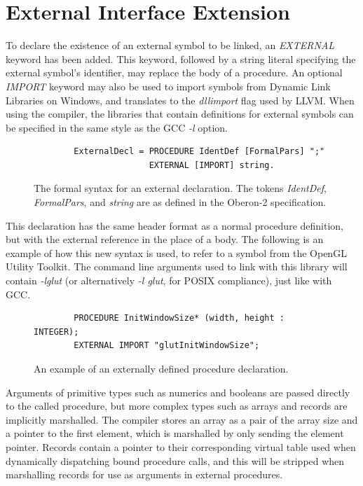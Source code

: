 \documentclass[a4paper,11pt]{article}
\begin{document}
    \section{External Interface Extension}
    To declare the existence of an external symbol to be linked, an \emph{EXTERNAL} keyword has been added. This keyword, followed by a string literal specifying the external symbol's identifier, may replace the body of a procedure. An optional \emph{IMPORT} keyword may also be used to import symbols from Dynamic Link Libraries on Windows, and translates to the \emph{dllimport} flag used by LLVM. When using the compiler, the libraries that contain definitions for external symbols can be specified in the same style as the GCC \emph{-l} option.

    \begin{figure}[!htbp]
    \begin{lstlisting}
        ExternalDecl = PROCEDURE IdentDef [FormalPars] ";"
                       EXTERNAL [IMPORT] string.
    \end{lstlisting}
    \caption{The formal syntax for an external declaration. The tokens \emph{IdentDef}, \emph{FormalPars}, and \emph{string} are as defined in the Oberon-2 specification\cite{oberspec}.}
    \end{figure}

    \noindent
    This declaration has the same header format as a normal procedure definition, but with the external reference in the place of a body. The following is an example of how this new syntax is used, to refer to a symbol from the OpenGL Utility Toolkit\cite{glut}. The command line arguments used to link with this library will contain \emph{-lglut} (or alternatively \emph{-l glut}, for POSIX compliance), just like with GCC.

    \begin{figure}[!htbp]
    \begin{lstlisting}
        PROCEDURE InitWindowSize* (width, height : INTEGER);
        EXTERNAL IMPORT "glutInitWindowSize";
    \end{lstlisting}
    \caption{An example of an externally defined procedure declaration.}
    \end{figure}

    \noindent
    Arguments of primitive types such as numerics and booleans are passed directly to the called procedure, but more complex types such as arrays and records are implicitly marshalled. The compiler stores an array as a pair of the array size and a pointer to the first element, which is marshalled by only sending the element pointer. Records contain a pointer to their corresponding virtual table used when dynamically dispatching bound procedure calls, and this will be stripped when marshalling records for use as arguments in external procedures.
\end{document}
